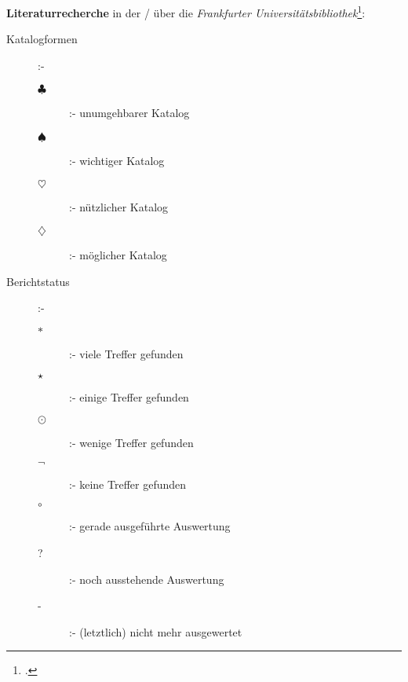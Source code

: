 \documentclass[
  DIV=calc,
  BCOR=5mm,
  11pt,
  headings=small,
  oneside,
  abstract=true,
  toc=bib,
  english,ngerman]{scrartcl}
\newcommand{\NecessaryCatalog}{$\clubsuit$}
\newcommand{\NecessaryCatalogDefinition}{unumgehbarer Katalog}
\newcommand{\ImportantCatalog}{$\spadesuit$}
\newcommand{\ImportantCatalogDefinition}{wichtiger Katalog}
\newcommand{\UsefulCatalog}{$\heartsuit$}
\newcommand{\UsefulCatalogDefinition}{nützlicher Katalog}
\newcommand{\PossibleCatalog}{$\diamondsuit$}
\newcommand{\PossibleCatalogDefinition}{möglicher Katalog}
\newcommand{\many}{$\ast$}
\newcommand{\manyDef}{viele Treffer gefunden}
\newcommand{\some}{$\star$}
\newcommand{\someDef}{einige Treffer gefunden}
\newcommand{\few}{$\odot$}
\newcommand{\fewDef}{wenige Treffer gefunden}
\newcommand{\nothing}{$\neg$}
\newcommand{\nothingDef}{keine Treffer gefunden}
\newcommand{\ongoing}{$\circ$}
\newcommand{\ongoingDef}{gerade ausgeführte Auswertung}
\newcommand{\open}{?}
\newcommand{\openDef}{noch ausstehende Auswertung}
\newcommand{\ignored}{-}
\newcommand{\ignoredDef}{(letztlich) nicht mehr ausgewertet}
\begin{document}
\textbf{Literaturrecherche} in der / über die 
\emph{Frankfurter Universitätsbibliothek}\footcite[s.][n.P.]{UbFam2018a}:


\begin{description}
  \item[Katalogformen] :-
    \begin{description}
      \item[\NecessaryCatalog] :- \NecessaryCatalogDefinition
      \item[\ImportantCatalog] :- \ImportantCatalogDefinition
      \item[\UsefulCatalog] :- \UsefulCatalogDefinition
      \item[\PossibleCatalog] :- \PossibleCatalogDefinition
    \end{description}
  \item[Berichtstatus] :-
    \begin{description}
      \item[\many] :- \manyDef
      \item[\some] :- \someDef
      \item[\few] :- \fewDef
      \item[\nothing] :- \nothingDef
      \item[\ongoing] :- \ongoingDef
      \item[\open] :- \openDef
      \item[\ignored] :- \ignoredDef
    \end{description}
\end{description}



\end{document}
